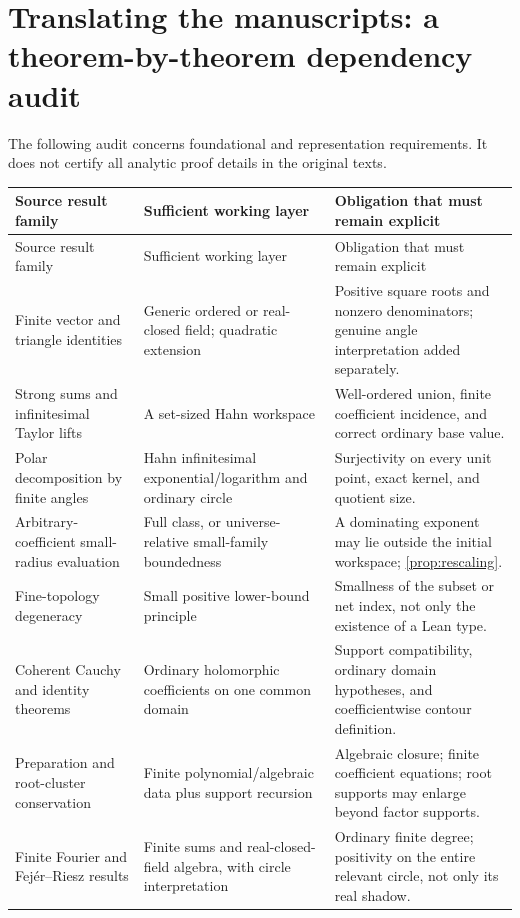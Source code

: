 \documentclass[11pt,letterpaper]{article}
\numberwithin{equation}{section}
\theoremstyle{definition}
\theoremstyle{remark}
\begin{document}
\section{Translating the manuscripts: a theorem-by-theorem dependency audit}\label{sec:audit}
The following audit concerns foundational and representation requirements. It does not certify all analytic proof details in the original texts.

\begin{longtable}{@{}L{0.25\textwidth}L{0.32\textwidth}L{0.34\textwidth}@{}}
\toprule
Source result family & Sufficient working layer & Obligation that must remain explicit\\\midrule
\endfirsthead
\toprule
Source result family & Sufficient working layer & Obligation that must remain explicit\\\midrule
\endhead
\bottomrule\endfoot
Finite vector and triangle identities & Generic ordered or real-closed field; quadratic extension & Positive square roots and nonzero denominators; genuine angle interpretation added separately.\\[0.4em]
Strong sums and infinitesimal Taylor lifts & A set-sized Hahn workspace & Well-ordered union, finite coefficient incidence, and correct ordinary base value.\\[0.4em]
Polar decomposition by finite angles & Hahn infinitesimal exponential/logarithm and ordinary circle & Surjectivity on every unit point, exact kernel, and quotient size.\\[0.4em]
Arbitrary-coefficient small-radius evaluation & Full class, or universe-relative small-family boundedness & A dominating exponent may lie outside the initial workspace; \cref{prop:rescaling}.\\[0.4em]
Fine-topology degeneracy & Small positive lower-bound principle & Smallness of the subset or net index, not only the existence of a Lean type.\\[0.4em]
Coherent Cauchy and identity theorems & Ordinary holomorphic coefficients on one common domain & Support compatibility, ordinary domain hypotheses, and coefficientwise contour definition.\\[0.4em]
Preparation and root-cluster conservation & Finite polynomial/algebraic data plus support recursion & Algebraic closure; finite coefficient equations; root supports may enlarge beyond factor supports.\\[0.4em]
Finite Fourier and Fej\'er--Riesz results & Finite sums and real-closed-field algebra, with circle interpretation & Ordinary finite degree; positivity on the entire relevant circle, not only its real shadow.\\[0.4em]

\end{longtable}
\end{document}
